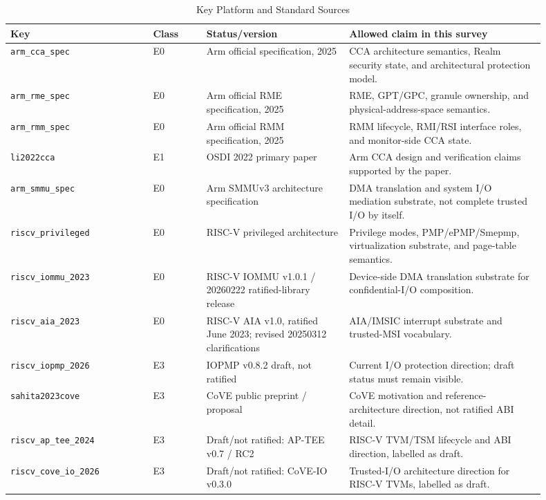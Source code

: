 \documentclass[conference]{IEEEtran}
\begin{document}
\begin{table}[t]
\centering
\scriptsize
\caption{Key Platform and Standard Sources}
\label{tab:key_platform_standard_sources}
\begin{tabular}{@{}p{0.24\linewidth}p{0.09\linewidth}p{0.24\linewidth}p{0.33\linewidth}@{}}
\toprule
\textbf{Key} & \textbf{Class} & \textbf{Status/version} & \textbf{Allowed claim in this survey} \\ \midrule
\texttt{arm\_cca\_spec} & E0 & Arm official specification, 2025 & CCA architecture semantics, Realm security state, and architectural protection model. \\
\texttt{arm\_rme\_spec} & E0 & Arm official RME specification, 2025 & RME, GPT/GPC, granule ownership, and physical-address-space semantics. \\
\texttt{arm\_rmm\_spec} & E0 & Arm official RMM specification, 2025 & RMM lifecycle, RMI/RSI interface roles, and monitor-side CCA state. \\
\texttt{li2022cca} & E1 & OSDI 2022 primary paper & Arm CCA design and verification claims supported by the paper. \\
\texttt{arm\_smmu\_spec} & E0 & Arm SMMUv3 architecture specification & DMA translation and system I/O mediation substrate, not complete trusted I/O by itself. \\
\texttt{riscv\_privileged} & E0 & RISC-V privileged architecture & Privilege modes, PMP/ePMP/Smepmp, virtualization substrate, and page-table semantics. \\
\texttt{riscv\_iommu\_2023} & E0 & RISC-V IOMMU v1.0.1 / 20260222 ratified-library release & Device-side DMA translation substrate for confidential-I/O composition. \\
\texttt{riscv\_aia\_2023} & E0 & RISC-V AIA v1.0, ratified June 2023; revised 20250312 clarifications & AIA/IMSIC interrupt substrate and trusted-MSI vocabulary. \\
\texttt{riscv\_iopmp\_2026} & E3 & IOPMP v0.8.2 draft, not ratified & Current I/O protection direction; draft status must remain visible. \\
\texttt{sahita2023cove} & E3 & CoVE public preprint / proposal & CoVE motivation and reference-architecture direction, not ratified ABI detail. \\
\texttt{riscv\_ap\_tee\_2024} & E3 & Draft/not ratified: AP-TEE v0.7 / RC2 & RISC-V TVM/TSM lifecycle and ABI direction, labelled as draft. \\
\texttt{riscv\_cove\_io\_2026} & E3 & Draft/not ratified: CoVE-IO v0.3.0 & Trusted-I/O architecture direction for RISC-V TVMs, labelled as draft. \\

\end{tabular}
\end{table}
\end{document}
